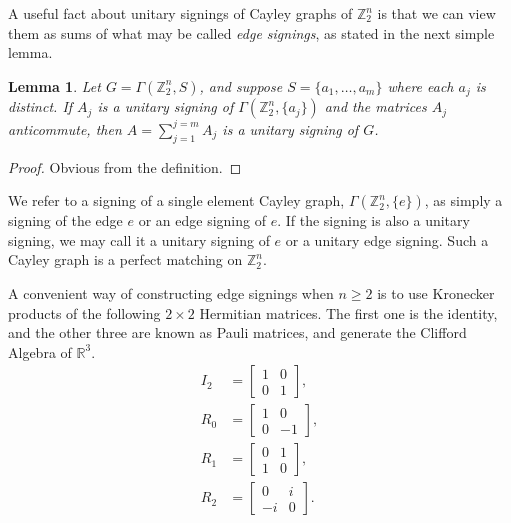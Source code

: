 \documentclass[11pt]{article}
\newtheorem{lemma}[theo]{Lemma}
\begin{document}
A useful fact about unitary signings of Cayley graphs
of ${\mathbb{Z}_{2}^{n}}$ is
that we can view them as sums of what may be called 
{\em edge signings}, as stated in the next
simple lemma.
\begin{lemma}
\label{lm: add signings}
Let $G = \Gamma(\mathbb{Z}_{2}^{n}, S)$,
and suppose $S = \{a_1, \ldots, a_m \}$ where each $a_j$
is distinct. If $A_j$ is a unitary signing of
$\Gamma(\mathbb{Z}_{2}^{n}, \{a_j\})$ and the matrices
$A_j$ anticommute, then
$A = \sum_{j=1}^{j=m} A_j$ is a unitary signing of $G$.
\end{lemma}
\begin{proof}
Obvious from the definition.
\end{proof}

We refer to a signing of a single element Cayley graph, 
$\Gamma(\mathbb{Z}_{2}^{n}, \{e\})$, as simply a signing of 
the edge $e$ or an edge signing of $e$. If the signing is also a unitary signing, we may call it a unitary signing of $e$ or a unitary edge signing. Such a Cayley graph is a perfect matching on ${\mathbb{Z}_{2}^{n}}$.

A convenient way of constructing edge signings when $n \geq 2$ is to 
use Kronecker products of the following $2 \times 2$ Hermitian matrices.
The first one is the identity, and the other three are 
known as Pauli matrices, and generate the Clifford Algebra of $\mathbb{R}^3$. 
\begin{align*}
I_2 &=
\left[
\begin{array}{cc}
1 & 0 \\
0 & 1 
\end{array}
\right], \\
R_0 &=
\left[
\begin{array}{cc}
1 & 0 \\
0 & -1 
\end{array}
\right], \\
R_1 &=
\left[
\begin{array}{cc}
0 & 1 \\
1 & 0 
\end{array}
\right], \\
R_2 &=
\left[
\begin{array}{cc}
0 & i \\
-i & 0 
\end{array}
\right]. \\
\end{align*}
\end{document}
